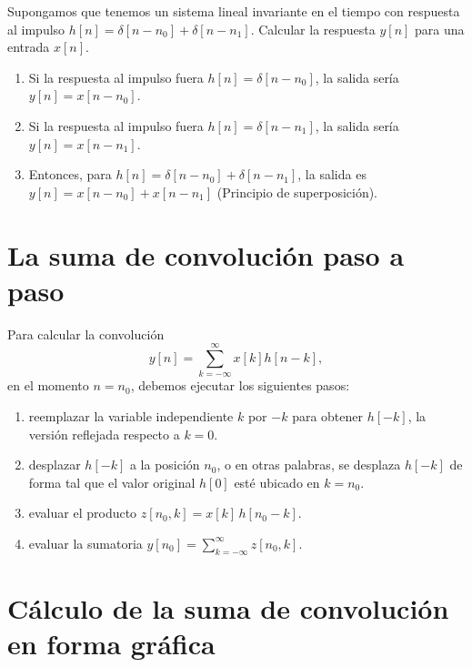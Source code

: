 Supongamos que tenemos un sistema lineal invariante en el tiempo con respuesta al impulso $h[n] = \delta[n - n_{0}] + \delta[n - n_{1}]$. Calcular la respuesta $y[n]$ para una entrada $x[n]$.

\begin{enumerate}
	\item Si la respuesta al impulso fuera $h[n] = \delta[n - n_{0}]$, la salida sería $y[n] = x[n - n_{0}]$.
	\item Si la respuesta al impulso fuera $h[n] = \delta[n - n_{1}]$, la salida sería $y[n] = x[n - n_{1}]$.
	\item Entonces, para $h[n] = \delta[n - n_{0}] + \delta[n - n_{1}]$, la salida es $y[n] = x[n - n_{0}] + x[n - n_{1}]$ (Principio de superposición).
\end{enumerate}

\section{La suma de convolución paso a paso}

Para calcular la convolución 
\begin{equation}
	y[n] = \sum_{k=-\infty}^{\infty} x[k] h[n - k],
\end{equation}
en el momento $n = n_{0}$, debemos ejecutar los siguientes pasos:
\begin{enumerate}
	\item reemplazar la variable independiente $k$ por $-k$ para obtener $h[-k]$, la versión reflejada respecto a $k = 0$.
	\item desplazar $h[-k]$ a la posición $n_{0}$, o en otras palabras, se desplaza $h[-k]$ de forma tal que el valor original $h[0]$ esté ubicado en $k = n_{0}$.
	\item evaluar el producto $z[n_{0},k] = x[k] \, h[n_{0} - k]$.
	\item evaluar la sumatoria $y[n_{0}] = \sum_{k=-\infty}^{\infty} z[n_{0},k]$.
\end{enumerate}

\section{Cálculo de la suma de convolución en forma gráfica}

